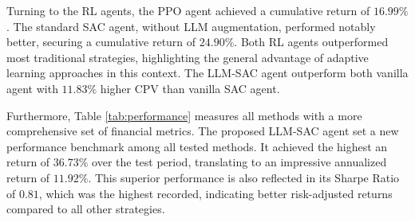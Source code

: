 
Turning to the \gls{RL} agents, the \gls{PPO} agent achieved a cumulative return of \(16.99\%\). The standard \gls{SAC} agent, without LLM augmentation, performed notably better, securing a cumulative return of \(24.90\%\). Both \gls{RL} agents outperformed most traditional strategies, highlighting the general advantage of adaptive learning approaches in this context. The LLM-SAC agent outperform both vanilla agent with \(11.83\%\) higher \gls{CPV} than vanilla \gls{SAC} agent.

Furthermore, Table \ref{tab:performance} measures all methods with a more comprehensive set of financial metrics. The proposed LLM-SAC agent set a new performance benchmark among all tested methods. It achieved the highest an return of \(36.73\%\) over the test period, translating to an impressive annualized return of \(11.92\%\). This superior performance is also reflected in its Sharpe Ratio of \(0.81\), which was the highest recorded, indicating better risk-adjusted returns compared to all other strategies. 

\begin{table}
  \centering
  \caption{Performance of different trading methods. The LLM-SAC agent is superior in every metrics except MDD.}
  \label{tab:performance}
\end{table}

